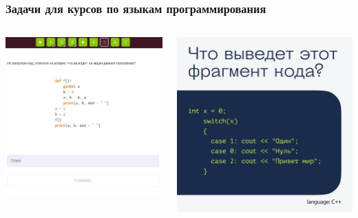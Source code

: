 \documentclass[14pt,aspectratio=169,hyperref={pdftex,unicode},xcolor=dvipsnames]{beamer}
\begin{document}
\begin{frame}
    \frametitle{Задачи для курсов по языкам программирования}
    \begin{columns}
        \begin{column}[]{0.45\textwidth}
            \includegraphics[width=\textwidth]{images/python-quest.jpg}
        \end{column}
        \begin{column}[]{0.45\textwidth}
            \includegraphics[width=\textwidth]{images/cpp-quest.jpg}
        \end{column}
    \end{columns}
\end{frame}
\end{document}

